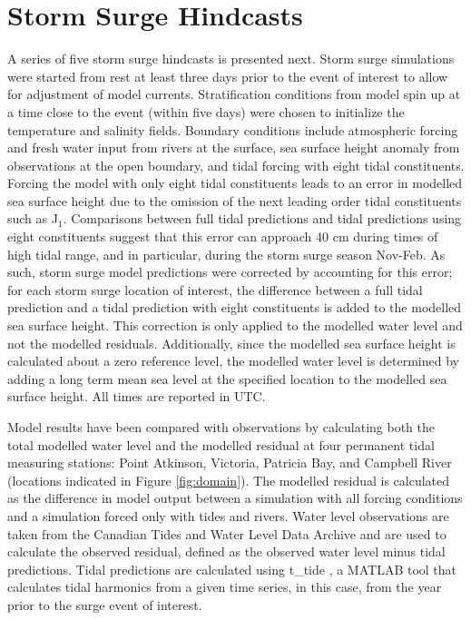 \documentclass{tATO2e}
\begin{document}
\section{Storm Surge Hindcasts}\label{sec:storm}
A series of five storm surge hindcasts is presented next. Storm surge simulations were started from rest at least three days prior to the event of interest to allow for adjustment of model currents. Stratification conditions from model spin up at a time close to the event (within five days) were chosen to initialize the temperature and salinity fields. Boundary conditions include atmospheric forcing and fresh water input from rivers at the surface, sea surface height anomaly from observations at the open boundary, and tidal forcing with eight tidal constituents. Forcing the model with only eight tidal constituents leads to an error in modelled sea surface height due to the omission of the next leading order tidal constituents such as J$_1$. Comparisons between full tidal predictions and tidal predictions using eight constituents suggest that this error can approach 40 cm during times of high tidal range, and in particular, during the storm surge season Nov-Feb. As such, storm surge model predictions were corrected by accounting for this error; for each storm surge location of interest, the difference between a full tidal prediction and a tidal prediction with eight constituents is added to the modelled sea surface height. This correction is only applied to the modelled water level and not the modelled residuals. Additionally, since the modelled sea surface height is calculated about a zero reference level, the modelled water level is determined by adding a long term mean sea level at the specified location to the modelled sea surface height. All times are reported in UTC.

Model results have been compared with observations by calculating both the total modelled water level and the modelled residual at four permanent tidal measuring stations: Point Atkinson, Victoria, Patricia Bay, and Campbell River (locations indicated in Figure \ref{fig:domain}). The modelled residual is calculated as the difference in model output between a simulation with all forcing conditions and a simulation forced only with tides and rivers. Water level observations are taken from the Canadian Tides and Water Level Data Archive \citep{DFOObservations} and are used to calculate the observed residual, defined as the observed water level minus tidal predictions. Tidal predictions are calculated using t\_tide \citep{pawlowicz2002classical}, a MATLAB tool that calculates tidal harmonics from a given time series, in this case, from the year prior to the surge event of interest. 
\end{document}

